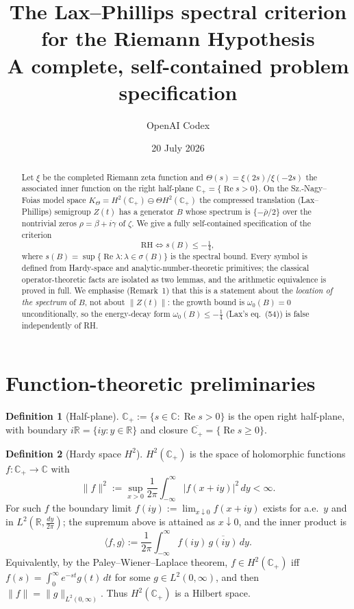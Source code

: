 \documentclass[11pt]{amsart}
\title{\bfseries The Lax--Phillips spectral criterion\\ for the Riemann Hypothesis\\[2pt]
\large A complete, self-contained problem specification}
\author{OpenAI Codex}
\date{20 July 2026}
\theoremstyle{plain}
\theoremstyle{definition}
\newtheorem{definition}{Definition}
\theoremstyle{remark}
\newcommand{\C}{\mathbb{C}}
\newcommand{\R}{\mathbb{R}}
\newcommand{\Cp}{\mathbb{C}_{+}}
\newcommand{\Ht}{H^{2}(\Cp)}
\newcommand{\Kt}{K_{\Theta}}
\newcommand{\ip}[2]{\langle #1, #2\rangle}
\newcommand{\norm}[1]{\lVert #1 \rVert}
\newcommand{\abs}[1]{\lvert #1 \rvert}
\renewcommand{\Re}{\operatorname{Re}}
\begin{document}
\maketitle

\begin{abstract}
Let $\xi$ be the completed Riemann zeta function and
$\Theta(s)=\xi(2s)/\xi(-2s)$ the associated inner function on the right half-plane
$\Cp=\{\Re s>0\}$. On the Sz.-Nagy--Foias model space $\Kt=\Ht\ominus\Theta\Ht$ the
compressed translation (Lax--Phillips) semigroup $Z(t)$ has a generator $B$ whose
spectrum is $\{-\bar\rho/2\}$ over the nontrivial zeros $\rho=\beta+i\gamma$ of $\zeta$.
We give a fully self-contained specification of the criterion
\[
  \mathrm{RH}\iff s(B)\le-\tfrac14 ,
\]
where $s(B)=\sup\{\Re\lambda:\lambda\in\sigma(B)\}$ is the spectral bound. Every symbol
is defined from Hardy-space and analytic-number-theoretic primitives; the classical
operator-theoretic facts are isolated as two lemmas, and the arithmetic equivalence is
proved in full. We emphasise (Remark~1) that this is a statement about the
\emph{location of the spectrum} of $B$, not about $\norm{Z(t)}$: the growth bound is
$\omega_0(B)=0$ unconditionally, so the energy-decay form $\omega_0(B)\le-\tfrac14$
(Lax's eq.~(54)) is false independently of RH.
\end{abstract}

\tableofcontents

\section{Function-theoretic preliminaries}

\begin{definition}[Half-plane]\label{def:halfplane}
$\Cp:=\{s\in\C:\Re s>0\}$ is the open right half-plane, with boundary
$i\R=\{iy:y\in\R\}$ and closure $\overline{\Cp}=\{\Re s\ge0\}$.
\end{definition}

\begin{definition}[Hardy space $H^{2}$]\label{def:hardy}
$\Ht$ is the space of holomorphic functions $f:\Cp\to\C$ with
\[
  \norm{f}^{2}:=\sup_{x>0}\frac{1}{2\pi}\int_{-\infty}^{\infty}\abs{f(x+iy)}^{2}\,dy<\infty .
\]
For such $f$ the boundary limit $f(iy):=\lim_{x\downarrow0}f(x+iy)$ exists for a.e.\ $y$
and in $L^{2}(\R,\tfrac{dy}{2\pi})$; the supremum above is attained as $x\downarrow0$, and
the inner product is
\[
  \ip{f}{g}:=\frac{1}{2\pi}\int_{-\infty}^{\infty}f(iy)\,\overline{g(iy)}\,dy .
\]
Equivalently, by the Paley--Wiener--Laplace theorem, $f\in\Ht$ iff
$f(s)=\int_{0}^{\infty}e^{-st}g(t)\,dt$ for some $g\in L^{2}(0,\infty)$, and then
$\norm{f}=\norm{g}_{L^{2}(0,\infty)}$. Thus $\Ht$ is a Hilbert space.
\end{definition}
\end{document}
